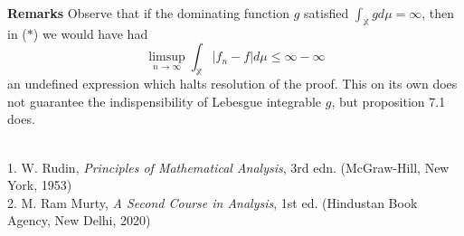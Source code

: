 \documentclass[11pt, letterpaper]{article}
\newcommand{\mbb}[1]{\mathbb{#1}}
\begin{document}
    \begin{center}
        \begin{minipage}[c]{0.85\linewidth}
            {\bf Remarks} Observe that if the dominating function $g$ satisfied $\int_\mbb{X}gd\mu=\infty$, then in ($\ast$) we would have had
            \[\limsup_{n\rightarrow\infty}\int_\mbb{X}|f_n-f|d\mu\leq \infty-\infty\]
            an undefined expression which halts resolution of the proof. This on its own does not guarantee the indispensibility of Lebesgue integrable $g$, but proposition 7.1 does.
        \end{minipage}
    \end{center}\vspace{10pt}
    \\[10pt]
    1. W. Rudin, {\it Principles of Mathematical Analysis}, 3rd edn. (McGraw-Hill, New York, 1953)\\[10pt]
    2. M. Ram Murty, {\it A Second Course in Analysis}, 1st ed. (Hindustan Book Agency, New Delhi, 2020)
\end{document}
